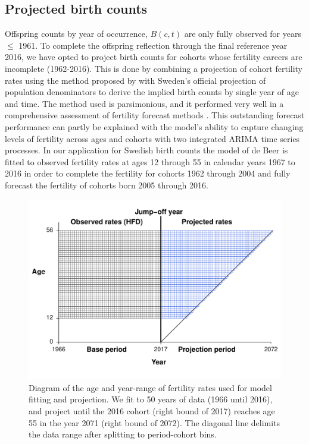 \subsection{Projected birth counts}
\label{sec:proj}
Offspring counts by year of occurrence, $B(c,t)$ are only fully observed for years $\le$ 1961. To complete the offspring reflection through the final reference year 2016, we have opted to project birth counts for cohorts whose fertility careers are incomplete (1962-2016). This is done by combining a projection of cohort fertility rates using the method proposed by \citet{de1985time} with Sweden's official projection of population denominators \citep{SCBpop, SCBproj} to derive the implied birth counts by single year of age and time. The method used is parsimonious, and it performed very well in a comprehensive assessment of fertility forecast methods \citep{bohk2018forecast}. This outstanding forecast performance can partly be explained with the model's ability to capture changing levels of fertility across ages and cohorts with two integrated ARIMA time series processes. In our application for Swedish birth counts the model of de Beer is fitted to observed fertility rates at ages 12 through 55 in calendar years 1967 to 2016 in order to complete the fertility for cohorts 1962 through 2004 and fully forecast the fertility of cohorts born 2005 through 2016.

\begin{figure}[ht!]
\begin{center}
\includegraphics[scale=.65]{Figures/ProjectionDiagram.pdf}
\caption{Diagram of the age and year-range of fertility rates used for model fitting and projection. We fit to 50 years of data (1966 until 2016), and project until the 2016 cohort (right bound of 2017) reaches age 55 in the year 2071 (right bound of 2072). The diagonal line delimits the data range after splitting to period-cohort bins.}
\label{fig:projdiag}
\end{center}
\end{figure}

